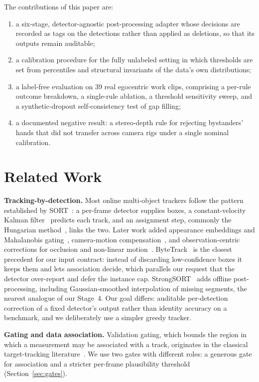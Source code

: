 \documentclass[journal]{IEEEtran}
\begin{document}
The contributions of this paper are:
\begin{enumerate}
\item a six-stage, detector-agnostic post-processing adapter whose decisions are recorded as tags on the detections rather than applied as deletions, so that its outputs remain auditable;
\item a calibration procedure for the fully unlabeled setting in which thresholds are set from percentiles and structural invariants of the data's own distributions;
\item a label-free evaluation on 39 real egocentric work clips, comprising a per-rule outcome breakdown, a single-rule ablation, a threshold sensitivity sweep, and a synthetic-dropout self-consistency test of gap filling;
\item a documented negative result: a stereo-depth rule for rejecting bystanders' hands that did not transfer across camera rigs under a single nominal calibration.
\end{enumerate}

\section{Related Work}
\label{sec:related}

\textbf{Tracking-by-detection.} Most online multi-object trackers follow the pattern established by SORT~\cite{bewley2016sort}: a per-frame detector supplies boxes, a constant-velocity Kalman filter~\cite{kalman1960} predicts each track, and an assignment step, commonly the Hungarian method~\cite{kuhn1955hungarian}, links the two. Later work added appearance embeddings and Mahalanobis gating~\cite{wojke2017deepsort}, camera-motion compensation~\cite{aharon2022botsort}, and observation-centric corrections for occlusion and non-linear motion~\cite{cao2023ocsort}. ByteTrack~\cite{zhang2022bytetrack} is the closest precedent for our input contract: instead of discarding low-confidence boxes it keeps them and lets association decide, which parallels our request that the detector over-report and defer the instance cap. StrongSORT~\cite{du2023strongsort} adds offline post-processing, including Gaussian-smoothed interpolation of missing segments, the nearest analogue of our Stage~4. Our goal differs: auditable per-detection correction of a fixed detector's output rather than identity accuracy on a benchmark, and we deliberately use a simpler greedy tracker.

\textbf{Gating and data association.} Validation gating, which bounds the region in which a measurement may be associated with a track, originates in the classical target-tracking literature~\cite{barshalom2009pdaf}. We use two gates with different roles: a generous gate for association and a stricter per-frame plausibility threshold (Section~\ref{sec:gates}).
\end{document}
